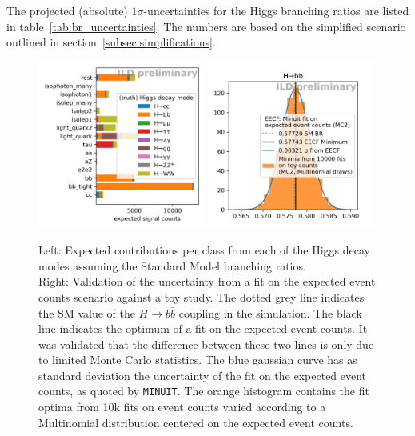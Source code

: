\documentclass[11pt, hidelinks, a4paper]{scrartcl}
\begin{document}
The projected (absolute) $1 \sigma$-uncertainties for the Higgs branching ratios
are listed in table~\ref{tab:br_uncertainties}.
The numbers are based on the simplified scenario
outlined in section~\ref{subsec:simplifications}.

\begin{figure}[ht]
    \centering
    \includegraphics[width=0.49\textwidth, keepaspectratio]{intro_category_counts}
    \includegraphics[width=0.49\textwidth, keepaspectratio]{H_bb}
    \caption{
        Left: Expected contributions per class from each of the Higgs decay modes
        assuming the Standard Model branching ratios.
        \\
        Right: Validation of the uncertainty from
        a fit on the expected event counts scenario against a toy study.
        The dotted grey line indicates the SM value of
        the $H \to b \bar{b}$ coupling in the simulation.
        The black line indicates the optimum of a fit on
        the expected event counts.
        It was validated that the difference between these two lines
        is only due to limited Monte Carlo statistics.
        The blue gaussian curve has as standard deviation the uncertainty of
        the fit on the expected event counts, as quoted by \texttt{MINUIT}.
        The orange histogram contains the fit optima from
        10k fits on event counts varied according to
        a Multinomial distribution centered on the expected event counts.
    }\label{fig:toys}
\end{figure}
\end{document}

